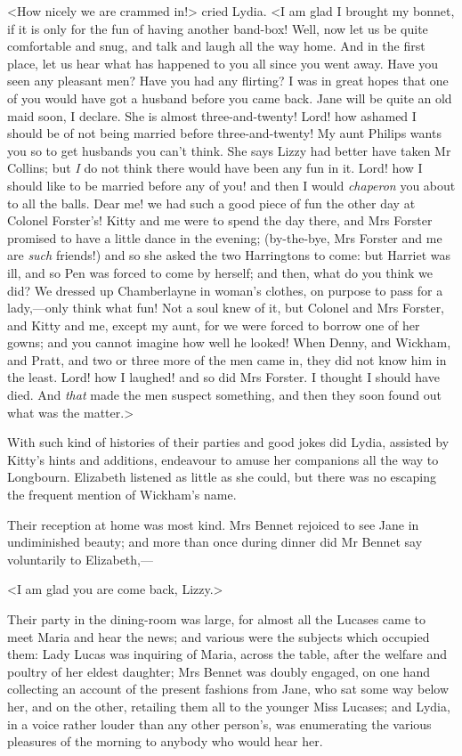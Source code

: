 <How nicely we are crammed in!> cried Lydia. <I am glad I brought my bonnet, if it is only for the fun of having another band-box! Well, now let us be quite comfortable and snug, and talk and laugh all the way home. And in the first place, let us hear what has happened to you all since you went away. Have you seen any pleasant men? Have you had any flirting? I was in great hopes that one of you would have got a husband before you came back. Jane will be quite an old maid soon, I declare. She is almost three-and-twenty! Lord! how ashamed I should be of not being married before three-and-twenty! My aunt Philips wants you so to get husbands you can't think. She says Lizzy had better have taken Mr Collins; but \textit{I} do not think there would have been any fun in it. Lord! how I should like to be married before any of you! and then I would \textit{chaperon} you about to all the balls. Dear me! we had such a good piece of fun the other day at Colonel Forster's! Kitty and me were to spend the day there, and Mrs Forster promised to have a little dance in the evening; (by-the-bye, Mrs Forster and me are \textit{such} friends!) and so she asked the two Harringtons to come: but Harriet was ill, and so Pen was forced to come by herself; and then, what do you think we did? We dressed up Chamberlayne in woman's clothes, on purpose to pass for a lady,—only think what fun! Not a soul knew of it, but Colonel and Mrs Forster, and Kitty and me, except my aunt, for we were forced to borrow one of her gowns; and you cannot imagine how well he looked! When Denny, and Wickham, and Pratt, and two or three more of the men came in, they did not know him in the least. Lord! how I laughed! and so did Mrs Forster. I thought I should have died. And \textit{that} made the men suspect something, and then they soon found out what was the matter.>

With such kind of histories of their parties and good jokes did Lydia, assisted by Kitty's hints and additions, endeavour to amuse her companions all the way to Longbourn. Elizabeth listened as little as she could, but there was no escaping the frequent mention of Wickham's name.

Their reception at home was most kind. Mrs Bennet rejoiced to see Jane in undiminished beauty; and more than once during dinner did Mr Bennet say voluntarily to Elizabeth,—

<I am glad you are come back, Lizzy.>

Their party in the dining-room was large, for almost all the Lucases came to meet Maria and hear the news; and various were the subjects which occupied them: Lady Lucas was inquiring of Maria, across the table, after the welfare and poultry of her eldest daughter; Mrs Bennet was doubly engaged, on one hand collecting an account of the present fashions from Jane, who sat some way below her, and on the other, retailing them all to the younger Miss Lucases; and Lydia, in a voice rather louder than any other person's, was enumerating the various pleasures of the morning to anybody who would hear her.

